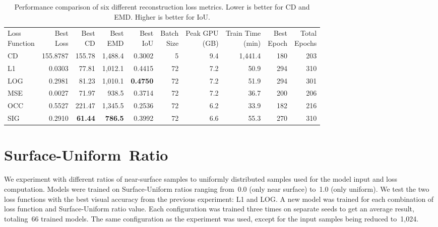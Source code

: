 \begin{table}[!htb]
	\centering
	\singlespace
	\footnotesize
	\setlength{\tabcolsep}{3pt}
	\setcellgapes{4pt}
	\makegapedcells
	\renewcommand{\bfdefault}{b}
	\begin{tabular}{|l|r|r|r|r|r|r|r|r|r|}
		\hline
		\makecell{Loss\\Function} & \makecell{Best\\Loss} & \makecell{Best\\CD} & \makecell{Best\\EMD} & \makecell{Best\\IoU} & \makecell{Batch\\Size} & \makecell{Peak GPU\\(GB)} & \makecell{Train Time\\(min)} & \makecell{Best\\Epoch} & \makecell{Total\\Epochs} \\
		\Xhline{1pt}
		CD  & 155.8787 & 155.78         & 1,488.4         & 0.3002          & 5  & 9.4 & 1,441.4 & 180 & 203 \\
		L1  & 0.0303   & 77.81          & 1,012.1         & 0.4415          & 72 & 7.2 & 50.9   & 294 & 310 \\
		LOG & 0.2981   & 81.23          & 1,010.1         & \textbf{0.4750} & 72 & 7.2 & 51.9   & 294 & 301 \\
		MSE & 0.0027   & 71.97          & 938.5          & 0.3714          & 72 & 7.2 & 36.7   & 200 & 206 \\
		OCC & 0.5527   & 221.47         & 1,345.5         & 0.2536          & 72 & 6.2 & 33.9   & 182 & 216 \\
		SIG & 0.2910   & \textbf{61.44} & \textbf{786.5} & 0.3992          & 72 & 6.6 & 55.3   & 270 & 310 \\
		\hline
	\end{tabular}
	\caption{Performance comparison of six different reconstruction loss metrics. Lower is better for CD and EMD. Higher is better for IoU.}
	\label{tab:loss_function_comparison}
\end{table}


\section{Surface-Uniform~Ratio}
\label{sec:surface_uniform_ratio_experiment}

We experiment with different ratios of near-surface samples to uniformly distributed samples used for the model input and loss computation. Models were trained on Surface-Uniform ratios ranging from~0.0 (only near surface) to~1.0 (only uniform). We test the two loss functions with the best visual accuracy from the previous experiment: L1 and LOG. A new model was trained for each combination of loss function and Surface-Uniform ratio value. Each configuration was trained three times on separate seeds to get an average result, totaling~66 trained models. The same configuration as the  experiment was used, except for the input samples being reduced to~1,024.

